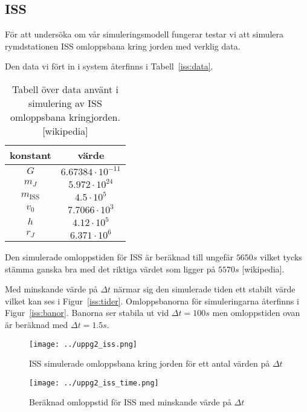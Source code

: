 \documentclass[a4]{article}
\begin{document}
	\subsection{ISS}
För att undersöka om vår simuleringsmodell fungerar testar vi att simulera
rymdstationen ISS omloppsbana kring jorden med verklig data.

Den data vi fört in i system återfinns i Tabell~\vref{iss:data}.
\begin{table}
\begin{center}
\begin{tabular}{c|c}
	konstant & värde \\
	\hline
	$G$       &  $6.67384 \cdot 10^{-11}$ \\
	$m_J$     &  $5.972 \cdot 10^{24}$ \\
	$m_{\mathrm{ISS}}$ &  $4.5 \cdot 10^5$ \\
	$v_0$     &  $7.7066 \cdot 10^3$ \\
	$h$       &  $4.12 \cdot 10^5$ \\
	$r_J$     &  $6.371 \cdot 10^6$
\end{tabular}
\caption{
Tabell över data använt i simulering av ISS omloppsbana
kringjorden.[wikipedia]}
\label{iss:data}
\end{center}
\end{table}

Den simulerade omloppstiden för ISS är beräknad till ungefär $5650s$ vilket
tycks stämma ganska bra med det riktiga värdet som ligger på $5570s$
[wikipedia].

Med minskande värde på $\Delta t$ närmar sig den simulerade tiden ett stabilt
värde vilket kan ses i Figur~\vref{iss:tider}.
Omloppsbanorna för simuleringarna återfinns i Figur~\vref{iss:banor}.
Banorna ser stabila ut vid $\Delta t = 100s$ men omloppstiden ovan är beräknad
med $\Delta t = 1.5s$.

\begin{figure}
\begin{center}
	\texttt{[image: ../uppg2\_iss.png]}
\end{center}
\caption{
	ISS simulerade omloppsbana kring jorden för ett antal värden på $\Delta t$
}
\label{iss:banor}
\end{figure}

\begin{figure}
\begin{center}
	\texttt{[image: ../uppg2\_iss\_time.png]}
\end{center}
\caption{
	Beräknad omloppstid för ISS med minskande värde på $\Delta t$
}
\label{iss:tider}
\end{figure}
\end{document}
